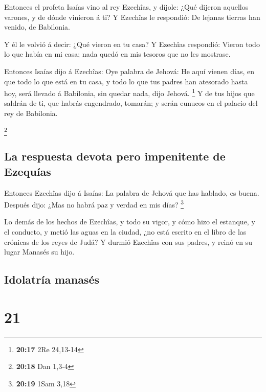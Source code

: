  Entonces el profeta Isaías vino al rey Ezechîas, y díjole:
¿Qué dijeron aquellos varones, y de dónde vinieron á ti? Y Ezechîas le
respondió: De lejanas tierras han venido, de Babilonia.

 Y él le volvió á decir: ¿Qué vieron en tu casa? Y Ezechîas
respondió: Vieron todo lo que había en mi casa; nada quedó en mis
tesoros que no les mostrase.

 Entonces Isaías dijo á Ezechîas: Oye palabra de Jehová:
 He aquí vienen días, en que todo lo que está en tu casa, y
todo lo que tus padres han atesorado hasta hoy, será llevado á
Babilonia, sin quedar nada, dijo Jehová. \footnote{\textbf{20:17} 2Re
  24,13-14}  Y de tus hijos que saldrán de ti, que habrás
engendrado, tomarán; y serán eunucos en el palacio del rey de Babilonia.

\footnote{\textbf{20:18} Dan 1,3-4}

\hypertarget{la-respuesta-devota-pero-impenitente-de-ezequuxedas}{%
\subsection{La respuesta devota pero impenitente de
Ezequías}\label{la-respuesta-devota-pero-impenitente-de-ezequuxedas}}

 Entonces Ezechîas dijo á Isaías: La palabra de Jehová que
has hablado, es buena. Después dijo: ¿Mas no habrá paz y verdad en mis
días? \footnote{\textbf{20:19} 1Sam 3,18}

 Lo demás de los hechos de Ezechîas, y todo su vigor, y
cómo hizo el estanque, y el conducto, y metió las aguas en la ciudad,
¿no está escrito en el libro de las crónicas de los reyes de Judá?
 Y durmió Ezechîas con sus padres, y reinó en su lugar
Manasés su hijo.

\hypertarget{idolatruxeda-manasuxe9s}{%
\subsection{Idolatría manasés}\label{idolatruxeda-manasuxe9s}}

\hypertarget{section-20}{%
\section{21}\label{section-20}}

